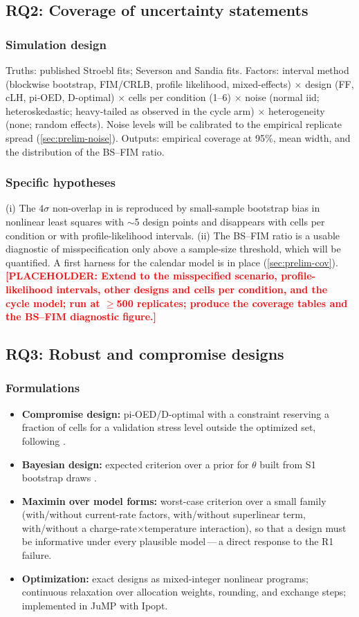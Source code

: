 \documentclass[11pt,letterpaper]{article}
\newcommand{\dash}{\,---\,}
\newcommand{\ph}[1]{\textcolor{red}{\textbf{[PLACEHOLDER: #1]}}}
\newcommand{\RQ}[1]{\textbf{RQ#1}}
\begin{document}
\subsection{\RQ2: Coverage of uncertainty statements}
\subsubsection{Simulation design}
Truths: published Stroebl fits; Severson and Sandia fits. Factors: interval method (blockwise bootstrap, FIM/CRLB, profile likelihood, mixed-effects) $\times$ design (FF, cLH, pi-OED, D-optimal) $\times$ cells per condition (1--6) $\times$ noise (normal iid; heteroskedastic; heavy-tailed as observed in the cycle arm) $\times$ heterogeneity (none; random effects). Noise levels will be calibrated to the empirical replicate spread (\cref{sec:prelim-noise}). Outputs: empirical coverage at 95\%, mean width, and the distribution of the BS--FIM ratio.
\subsubsection{Specific hypotheses}
(i) The $4\sigma$ non-overlap in \cite{stroebl2026} is reproduced by small-sample bootstrap bias in nonlinear least squares with $\sim$5 design points and disappears with cells per condition or with profile-likelihood intervals. (ii) The BS--FIM ratio is a usable diagnostic of misspecification only above a sample-size threshold, which will be quantified. A first harness for the calendar model is in place (\cref{sec:prelim-cov}). \ph{Extend to the misspecified scenario, profile-likelihood intervals, other designs and cells per condition, and the cycle model; run at $\ge$500 replicates; produce the coverage tables and the BS--FIM diagnostic figure.}

\subsection{\RQ3: Robust and compromise designs}
\subsubsection{Formulations}
\begin{itemize}
  \item \textbf{Compromise design:} pi-OED/D-optimal with a constraint reserving a fraction of cells for a validation stress level outside the optimized set, following \cite{limyum2011}.
  \item \textbf{Bayesian design:} expected criterion over a prior for $\theta$ built from S1 bootstrap draws \cite{chaloner1995}.
  \item \textbf{Maximin over model forms:} worst-case criterion over a small family (with/without current-rate factors, with/without superlinear term, with/without a charge-rate$\times$temperature interaction), so that a design must be informative under every plausible model\dash a direct response to the R1 failure.
  \item \textbf{Optimization:} exact designs as mixed-integer nonlinear programs; continuous relaxation over allocation weights, rounding, and exchange steps; implemented in JuMP with Ipopt.
\end{itemize}
\end{document}
